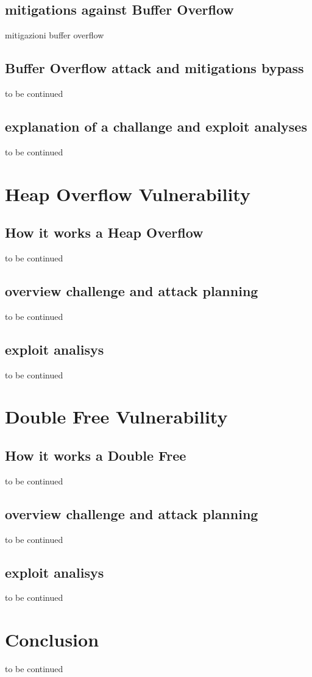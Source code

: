 \documentclass{report}
\begin{document}
    \section{mitigations against Buffer Overflow}
    mitigazioni buffer overflow
    \clearpage
    \section{Buffer Overflow attack and mitigations bypass}
    to be continued
    \clearpage
    \section{explanation of a challange and exploit analyses}
    to be continued
    
    
    \chapter{Heap Overflow Vulnerability}
    \section{How it works a Heap Overflow}
    to be continued
    \clearpage
    \section{overview challenge and attack planning}
    to be continued
    \clearpage
    \section{exploit analisys}
    to be continued
    \clearpage
    \chapter{Double Free Vulnerability}
    \section{How it works a Double Free}
    to be continued    
    \clearpage
    \section{overview challenge and attack planning}
    to be continued
    \clearpage
    \section{exploit analisys}
    to be continued
    \clearpage
    \chapter{Conclusion}
    to be continued
    \clearpage
\end{document}
